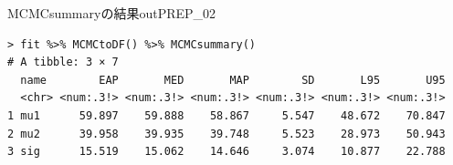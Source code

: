 \begin{Rscreen}{MCMCsummaryの結果}{outPREP_02}
	\begin{verbatim}
> fit %>% MCMCtoDF() %>% MCMCsummary()
# A tibble: 3 × 7
  name        EAP       MED       MAP        SD       L95       U95
  <chr> <num:.3!> <num:.3!> <num:.3!> <num:.3!> <num:.3!> <num:.3!>
1 mu1      59.897    59.888    58.867     5.547    48.672    70.847
2 mu2      39.958    39.935    39.748     5.523    28.973    50.943
3 sig      15.519    15.062    14.646     3.074    10.877    22.788
  \end{verbatim}
\end{Rscreen}
